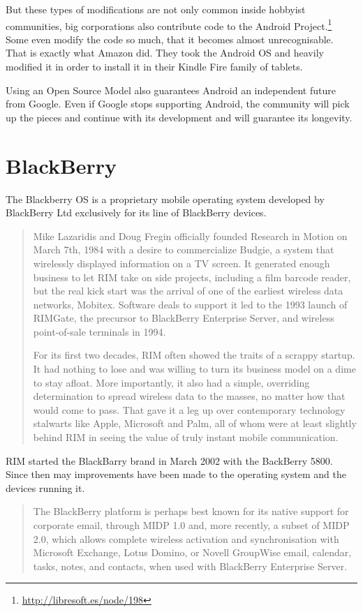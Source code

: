 But these types of modifications are not only common inside hobbyist communities, big corporations also contribute code to the Android Project.\footnote{\url{http://libresoft.es/node/198}} Some even modify the code so much, that it becomes almost unrecognisable. That is exactly what Amazon did. They took the Android OS and heavily modified it in order to install it in their Kindle Fire family of tablets.


Using an Open Source Model also guarantees Android an independent future from Google. Even if Google stops supporting  Android, the community will pick up the pieces and continue with its development and will guarantee its longevity.

\section{BlackBerry}
The Blackberry OS is a proprietary mobile operating system developed by BlackBerry Ltd exclusively for its line of BlackBerry devices.

\begin{quotation}
Mike Lazaridis and Doug Fregin officially founded Research in Motion on March 7th, 1984 with a desire to commercialize Budgie, a system that wirelessly displayed information on a TV screen. It generated enough business to let RIM take on side projects, including a film barcode reader, but the real kick start was the arrival of one of the earliest wireless data networks, Mobitex. Software deals to support it led to the 1993 launch of RIMGate, the precursor to BlackBerry Enterprise Server, and wireless point-of-sale terminals in 1994.

For its first two decades, RIM often showed the traits of a scrappy startup. It had nothing to lose and was willing to turn its business model on a dime to stay afloat. More importantly, it also had a simple, overriding determination to spread wireless data to the masses, no matter how that would come to pass. That gave it a leg up over contemporary technology stalwarts like Apple, Microsoft and Palm, all of whom were at least slightly behind RIM in seeing the value of truly instant mobile communication.
\cite{fingas:2013}
\end{quotation}

RIM started the BlackBarry brand in March 2002 with the BackBerry 5800. Since then may improvements have been made to the operating system and the devices running it.
\begin{quotation}
The BlackBerry platform is perhaps best known for its native support for corporate email, through MIDP 1.0 and, more recently, a subset of MIDP 2.0, which allows complete wireless activation and synchronisation with Microsoft Exchange, Lotus Domino, or Novell GroupWise email, calendar, tasks, notes, and contacts, when used with BlackBerry Enterprise Server.
\cite{wikipedia:bb}
\end{quotation}

